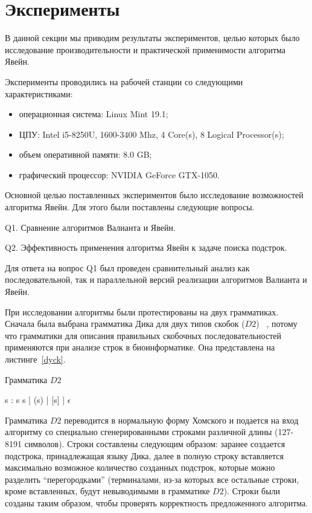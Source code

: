 \section{Эксперименты}

В данной секции мы приводим результаты экспериментов, целью которых было исследование производительности и практической применимости алгоритма Явейн.

Эксперименты проводились на рабочей станции со следующими характеристиками:
\begin{itemize}
    \item операционная система: Linux Mint 19.1;
    \item ЦПУ: Intel i5-8250U, 1600-3400 Mhz, 4 Core(s), 8 Logical Processor(s);
    \item объем оперативной памяти: 8.0 GB;
    \item графический процессор: NVIDIA GeForce GTX-1050.
\end{itemize}

Основной целью поставленных экспериментов было исследование возможностей алгоритма Явейн.
Для этого были поставлены следующие вопросы.

Q1. Сравнение алгоритмов Валианта и Явейн.

Q2. Эффективность применения алгоритма Явейн к задаче поиска подстрок.

Для ответа на вопрос Q1 был проведен сравнительный анализ как последовательной, так и параллельной версий реализации алгоритмов Валианта и Явейн.

При исследовании алгоритмы были протестированы на двух грамматиках. Сначала была выбрана грамматика Дика для двух типов скобок ($D2$) ~\cite{hopcroft1969formal}, потому что грамматики для описания правильных скобочных последовательностей применяются при анализе строк в биоинформатике. Она представлена на листинге~\ref{dyck}.

\begin{listing}
\caption{Грамматика $D2$}

\quad\quad\quad\quad\quad\quad\quad\quad\quad\quad\quad\quad s : s s  |  (s) |  [s]  |  $\epsilon$

\label{dyck}
\end{listing}

Грамматика $D2$ переводится в нормальную форму Хомского и подается на вход алгоритму со специально сгенерированными строками различной длины (127-8191 символов). Строки составлены следующим образом: заранее создается подстрока, принадлежащая языку Дика, далее в полную строку вставляется максимально возможное количество созданных подстрок, которые можно разделить “перегородками” (терминалами, из-за которых все остальные строки, кроме вставленных, будут невыводимыми в грамматике $D2$). Строки были созданы таким образом, чтобы проверять корректность предложенного алгоритма.

